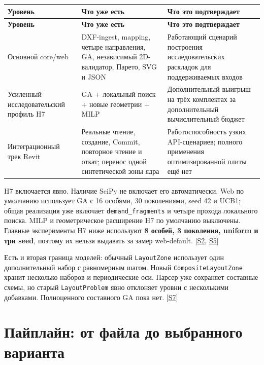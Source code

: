 \documentclass[11pt,a4paper]{article}
\begin{document}
{\small\setlength{\tabcolsep}{4pt}
\begin{longtable}{@{}L{41.178mm}L{63.351mm}L{53.848mm}@{}}
\toprule
\textbf{Уровень} & \textbf{Что уже есть} & \textbf{Что это подтверждает} \\
\midrule\endfirsthead
\toprule
\textbf{Уровень} & \textbf{Что уже есть} & \textbf{Что это подтверждает} \\
\midrule\endhead
\bottomrule\endfoot
Основной core/web & DXF-ingest, mapping, четыре направления, GA, независимый 2D-валидатор, Парето, SVG и JSON & Работающий сценарий построения исследовательских раскладок для поддерживаемых входов \\
Усиленный исследовательский профиль H7 & GA + локальный поиск + новые геометрии + MILP & Дополнительный выигрыш на трёх комплектах за дополнительный вычислительный бюджет \\
Интеграционный трек Revit & Реальные чтение, создание, Commit, повторное чтение и откат; перенос одной синтетической зоны ядра & Работоспособность узких API-сценариев; полного применения оптимизированной плиты ещё нет \\
\end{longtable}}

H7 включается явно. Наличие SciPy не включает его автоматически. Web по умолчанию использует GA с 16 особями, 30 поколениями, seed 42 и UCB1; общая реализация уже включает {\small\nolinkurl{demand_fragments}} и четыре прохода локального поиска. MILP и геометрическое расширение H7 по умолчанию выключены. Главные эксперименты H7 ниже используют \textbf{8 особей, 3 поколения, uniform и три seed}, поэтому их нельзя выдавать за замер web-default. {\color{Teal}\small[\hyperlink{S2}{S2}, \hyperlink{S5}{S5}]}


Есть и вторая граница моделей: обычный {\small\nolinkurl{LayoutZone}} использует один дополнительный набор с равномерным шагом. Новый {\small\nolinkurl{CompositeLayoutZone}} хранит несколько наборов и периодические оси. Парсер уже сохраняет составные схемы, но старый {\small\nolinkurl{LayoutProblem}} явно отклоняет уровни с несколькими добавками. Полноценного составного GA пока нет. {\color{Teal}\small[\hyperlink{S7}{S7}]}


\section{Пайплайн: от файла до выбранного варианта}
\end{document}
